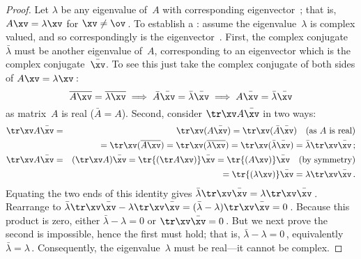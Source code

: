 \begin{proof} 
Let \(\lambda\) be any eigenvalue of~\(A\) with corresponding eigenvector~\xv; that is, \(A\xv=\lambda\xv\) for \(\xv\neq\ov\)\,.
To establish a : assume the eigenvalue~\(\lambda\) is complex valued, and so correspondingly is the eigenvector~\xv.
First,  the complex conjugate~\(\bar\lambda\) must be another eigenvalue of~\(A\), corresponding to an eigenvector which is the complex conjugate~\(\bar\xv\).
To see this just take the complex conjugate of both sides of \(A\xv=\lambda\xv\)\,:
\begin{equation*}
\overline{A\xv}=\overline{\lambda\xv}
\implies \bar A\bar\xv=\bar\lambda\bar\xv
\implies A\bar\xv=\bar\lambda\bar\xv
\end{equation*}
as matrix~\(A\) is real (\(\bar A=A\)).
Second, consider \(\tr\xv A\bar\xv\) in two ways:
\begin{eqnarray*}
\tr\xv A\bar\xv&=&\tr\xv(A\bar\xv)
=\tr\xv(\bar A\bar\xv)\quad\text{(as \(A\) is real)}
\\&&{}=\tr\xv(\overline{ A\xv})
=\tr\xv(\overline{ \lambda\xv})
=\tr\xv(\bar\lambda\bar\xv)
=\bar\lambda\tr\xv\bar\xv\,;
\\\tr\xv A\bar\xv&=&(\tr\xv A)\bar\xv
=\tr{(\tr A\xv)}\bar\xv
=\tr{(A\xv)}\bar\xv
\quad\text{(by symmetry)}
\\&&{}=\tr{(\lambda\xv)}\bar\xv
=\lambda\tr\xv\bar\xv\,.
\end{eqnarray*}
Equating the two ends of this identity gives \(\bar\lambda\tr\xv\bar\xv=\lambda\tr\xv\bar\xv\)\,.
Rearrange to \(\bar\lambda\tr\xv\bar\xv-\lambda\tr\xv\bar\xv
=(\bar\lambda-\lambda)\tr\xv\bar\xv
=0\)\,.
Because this product is zero, either \(\bar\lambda-\lambda=0\) or \(\tr\xv\bar\xv=0\)\,.
But we next prove the second is impossible, hence the first must hold; that is, \(\bar\lambda-\lambda=0\)\,, equivalently \(\bar\lambda=\lambda\)\,.
Consequently, the eigenvalue~\(\lambda\) must be real---it cannot be complex.


\end{proof}
